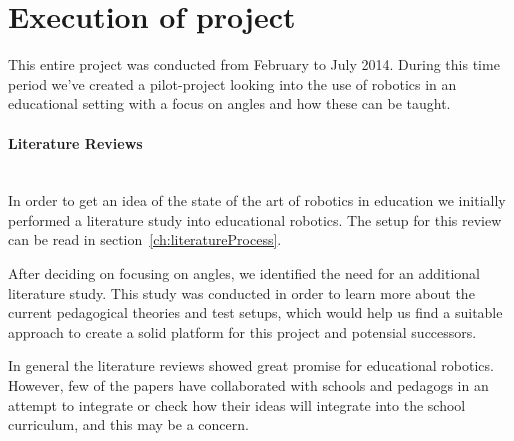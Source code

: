 \section{Execution of project}
This entire project was conducted from February to July 2014. During this time period we've created a pilot-project looking into the use of robotics in an educational setting with a focus on angles and how these can be taught.
%

\paragraph{Literature Reviews}~\\	
In order to get an idea of the state of the art of robotics in education we initially performed a literature study into educational robotics. The setup for this review can be read in section~\ref{ch:literatureProcess}.

\bigskip\noindent
After deciding on focusing on angles, we identified the need for an additional literature study. This study was conducted in order to learn more about the current pedagogical theories and test setups, which would help us find a suitable approach to create a solid platform for this project and potensial successors. 
%

\bigskip\noindent
In general the literature reviews showed great promise for educational robotics. However, few of the papers have collaborated with schools and pedagogs in an attempt to integrate or check how their ideas will integrate into the school curriculum, and this may be a concern.

